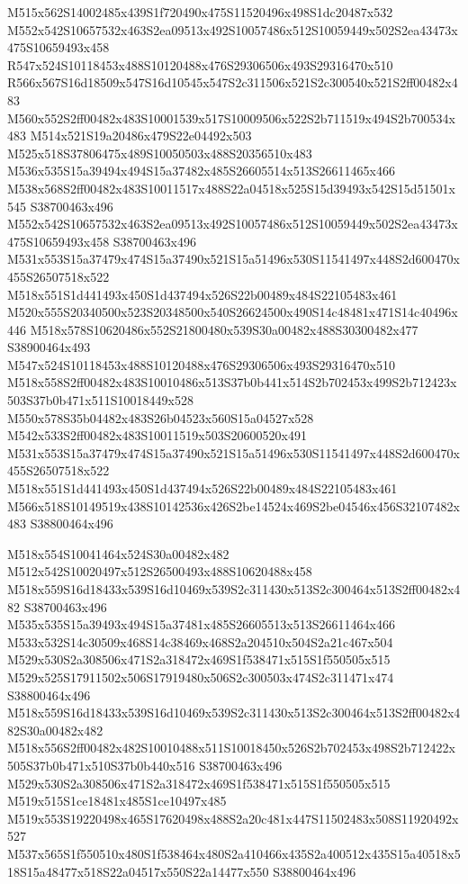 \documentclass{article}
\begin{document}
\begin{multicols}{2}
M515x562S14002485x439S1f720490x475S11520496x498S1dc20487x532 M552x542S10657532x463S2ea09513x492S10057486x512S10059449x502S2ea43473x475S10659493x458 R547x524S10118453x488S10120488x476S29306506x493S29316470x510 R566x567S16d18509x547S16d10545x547S2c311506x521S2c300540x521S2ff00482x483 M560x552S2ff00482x483S10001539x517S10009506x522S2b711519x494S2b700534x483 M514x521S19a20486x479S22e04492x503 M525x518S37806475x489S10050503x488S20356510x483 M536x535S15a39494x494S15a37482x485S26605514x513S26611465x466 M538x568S2ff00482x483S10011517x488S22a04518x525S15d39493x542S15d51501x545 S38700463x496 M552x542S10657532x463S2ea09513x492S10057486x512S10059449x502S2ea43473x475S10659493x458 S38700463x496 M531x553S15a37479x474S15a37490x521S15a51496x530S11541497x448S2d600470x455S26507518x522 M518x551S1d441493x450S1d437494x526S22b00489x484S22105483x461 M520x555S20340500x523S20348500x540S26624500x490S14c48481x471S14c40496x446 M518x578S10620486x552S21800480x539S30a00482x488S30300482x477 S38900464x493 M547x524S10118453x488S10120488x476S29306506x493S29316470x510 M518x558S2ff00482x483S10010486x513S37b0b441x514S2b702453x499S2b712423x503S37b0b471x511S10018449x528 M550x578S35b04482x483S26b04523x560S15a04527x528 M542x533S2ff00482x483S10011519x503S20600520x491 M531x553S15a37479x474S15a37490x521S15a51496x530S11541497x448S2d600470x455S26507518x522 M518x551S1d441493x450S1d437494x526S22b00489x484S22105483x461 M566x518S10149519x438S10142536x426S2be14524x469S2be04546x456S32107482x483 S38800464x496

M518x554S10041464x524S30a00482x482 M512x542S10020497x512S26500493x488S10620488x458 M518x559S16d18433x539S16d10469x539S2c311430x513S2c300464x513S2ff00482x482 S38700463x496 M535x535S15a39493x494S15a37481x485S26605513x513S26611464x466 M533x532S14c30509x468S14c38469x468S2a204510x504S2a21c467x504 M529x530S2a308506x471S2a318472x469S1f538471x515S1f550505x515 M529x525S17911502x506S17919480x506S2c300503x474S2c311471x474 S38800464x496 M518x559S16d18433x539S16d10469x539S2c311430x513S2c300464x513S2ff00482x482S30a00482x482 M518x556S2ff00482x482S10010488x511S10018450x526S2b702453x498S2b712422x505S37b0b471x510S37b0b440x516 S38700463x496 M529x530S2a308506x471S2a318472x469S1f538471x515S1f550505x515 M519x515S1ce18481x485S1ce10497x485 M519x553S19220498x465S17620498x488S2a20c481x447S11502483x508S11920492x527 M537x565S1f550510x480S1f538464x480S2a410466x435S2a400512x435S15a40518x518S15a48477x518S22a04517x550S22a14477x550 S38800464x496


\end{multicols}
\end{document}
